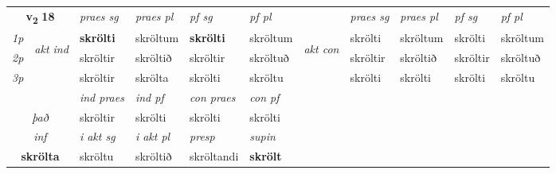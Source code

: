 \noindent
\begin{tabular}{lllllllllll} \toprule
\multicolumn{2}{c}{\textbf{v{\textsubscript{2}}} \Large{\textbf{18}}}  &  \textit{praes sg}  & \textit{praes pl}  &\textit{ pf sg} & \textit{pf pl} &  &  \textit{praes sg}  & \textit{praes pl}  & \textit{pf sg} & \textit{pf pl } \\*
	\cmidrule{3-6} \cmidrule{8-11}
 {\textit{1p}} & \multirow{3}{*}{\begin{turn}{90}\textit{akt ind}\end{turn}} & \textbf{skrölti} & skröltum & \textbf{skrölti} & skröltum & \multirow{3}{*}{\begin{turn}{90}\textit{akt con}\end{turn}} &skrölti & skröltum & skrölti & skröltum\\*
 {\textit{2p}} &  &  skröltir  & skröltið & skröltir & skröltuð & & skröltir & skröltið & skröltir & skröltuð \\*
{\textit{3p}} &  & skröltir & skrölta & skrölti & skröltu & & skrölti & skrölti& skrölti & skröltu \\*
\cmidrule{3-6} \cmidrule{8-11}

   & &  \textit{ind praes} & \textit{ind pf} & \textit{con praes} & \textit{con pf} \\*
\multicolumn{2}{c}{ \textit{það} } & skröltir & skrölti & skrölti & skrölti \\*

\cmidrule{3-6}
   \multicolumn{2}{c}{\textit{inf}}  & \textit{i akt sg} & \textit{i akt pl}   & \textit{presp} & \textit{supin}   \\*
  \multicolumn{2}{c}{\textbf{skrölta}} & skröltu  & skröltið   & skröltandi &  \textbf{skrölt}   \\*
\end{tabular}

